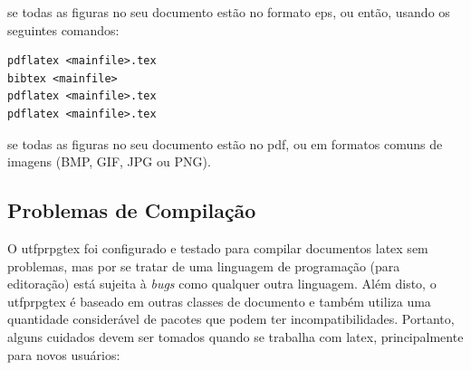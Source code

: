 \noindent se todas as figuras no seu documento estão no formato \gls{eps}, ou então, usando os seguintes comandos:

\begin{SingleSpacing}%
\begin{verbatim}
pdflatex <mainfile>.tex
bibtex <mainfile>
pdflatex <mainfile>.tex
pdflatex <mainfile>.tex
\end{verbatim}
\end{SingleSpacing}

\noindent se todas as figuras no seu documento estão no \gls{pdf}, ou em formatos comuns de imagens (BMP, GIF, JPG ou PNG).

\subsection{Problemas de Compilação}\label{sec:problemas}

O \gls{utfprpgtex} foi configurado e testado para compilar documentos \gls{latex} sem problemas, mas por se tratar de uma linguagem de programação (para editoração) está sujeita à \textit{bugs} como qualquer outra linguagem. Além disto, o \gls{utfprpgtex} é baseado em outras classes de documento e também utiliza uma quantidade considerável de pacotes que podem ter incompatibilidades. Portanto, alguns cuidados devem ser tomados quando se trabalha com \gls{latex}, principalmente para novos usuários:

